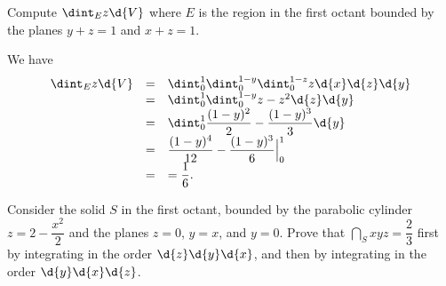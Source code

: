 \section*{}
\begin{pro}
Compute $\dint _E z\d{V}$ where $E$ is the region in the first octant
bounded by the planes $y+z = 1$ and $x+z = 1$.
\begin{answer}
We have
$$\begin{array}{lll}
\dint _E z\d{V} & = & \dint _0 ^1 \dint _0 ^{1-y}\dint _0
^{1-z}z\d{x}\d{z}\d{y}
\\
& = & \dint _0 ^1 \dint _0 ^{1-y}z-z^2\d{z}\d{y}
\\
& = & \dint _0 ^1 \dfrac{(1-y)^2}{2}-\dfrac{(1-y)^3}{3}\d{y}
\\
& = &  \dfrac{(1-y)^4}{12}-\dfrac{(1-y)^3}{6}\Big| _0 ^1
\\
& = & =\dfrac{1}{6}.
\end{array}$$
\end{answer}
\end{pro}
\begin{pro}
Consider the solid $S$ in the first octant, bounded by the parabolic
cylinder $z=2-\dfrac{x^2}{2}$ and the planes $z=0$, $y=x$, and
$y=0$. Prove that $\dint _S xyz = \dfrac{2}{3}$ first by integrating
in the order $\d{z}\d{y}\d{x}$, and then by integrating in the order
$\d{y}\d{x}\d{z}$.
\end{pro}

